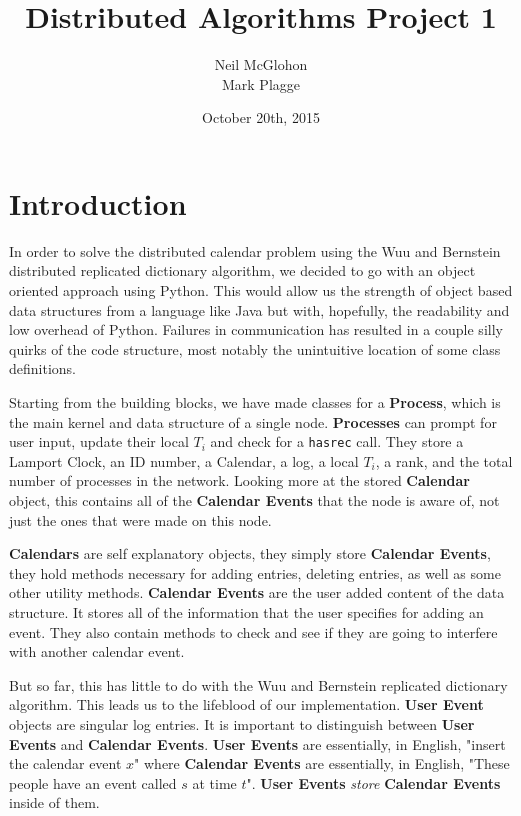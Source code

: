 \documentclass[11pt]{article} %
\title{	
\normalfont \large 
Distributed Algorithms Project 1 \\ %
}
\author{\small Neil McGlohon\\\small Mark Plagge} %
\date{October 20th, 2015} %
\begin{document}
\maketitle %


\section{Introduction}
In order to solve the distributed calendar problem using the Wuu and Bernstein distributed replicated dictionary  algorithm, we decided to go with an object oriented approach using Python. This would allow us the strength of object based data structures from a language like Java but with, hopefully, the readability and low overhead of Python. Failures in communication has resulted in a couple silly quirks of the code structure, most notably the unintuitive location of some class definitions.

Starting from the building blocks, we have made classes for a \textbf{Process}, which is the main kernel and data structure of a single node. \textbf{Processes} can prompt for user input, update their local $T_i$ and check for a \texttt{hasrec} call. They store a Lamport Clock, an ID number, a Calendar, a log, a local $T_i$, a rank, and the total number of processes in the network. Looking more at the stored \textbf{Calendar} object, this contains all of the \textbf{Calendar Events} that the node is aware of, not just the ones that were made on this node.

\textbf{Calendars} are self explanatory objects, they simply store \textbf{Calendar Events}, they hold methods necessary for adding entries, deleting entries, as well as some other utility methods. \textbf{Calendar Events} are the user added content of the data structure. It stores all of the information that the user specifies for adding an event. They also contain methods to check and see if they are going to interfere with another calendar event.

But so far, this has little to do with the Wuu and Bernstein replicated dictionary algorithm. This leads us to the lifeblood of our implementation. \textbf{User Event} objects are singular log entries. It is important to distinguish between \textbf{User Events} and \textbf{Calendar Events}. \textbf{User Events} are essentially, in English, "insert the calendar event $x$" where \textbf{Calendar Events} are essentially, in English, "These people have an event called $s$ at time $t$". \textbf{User Events} \emph{store} \textbf{Calendar Events} inside of them.
\end{document}
